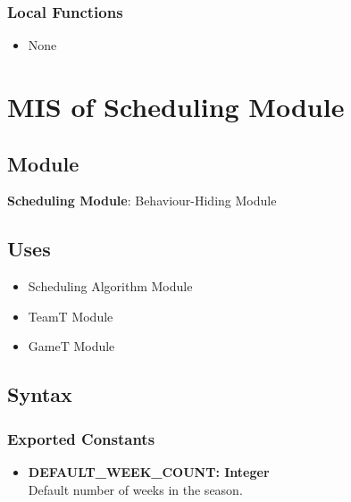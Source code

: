 \documentclass[12pt, titlepage]{article}
\begin{document}
\begin{itemize}
\subsubsection{Local Functions}
\begin{itemize}
  \item None
\end{itemize}

\section{MIS of Scheduling Module} \label{SchedulingModule}

\subsection{Module}
\textbf{Scheduling Module}: Behaviour-Hiding Module

\subsection{Uses}
\begin{itemize}
    \item Scheduling Algorithm Module
    \item TeamT Module
    \item GameT Module
\end{itemize}

\subsection{Syntax}

\subsubsection{Exported Constants}

\begin{itemize}
    \item \textbf{DEFAULT\_WEEK\_COUNT: Integer} \\ Default number of weeks in the season.
\end{itemize}


\end{itemize}
\end{document}
